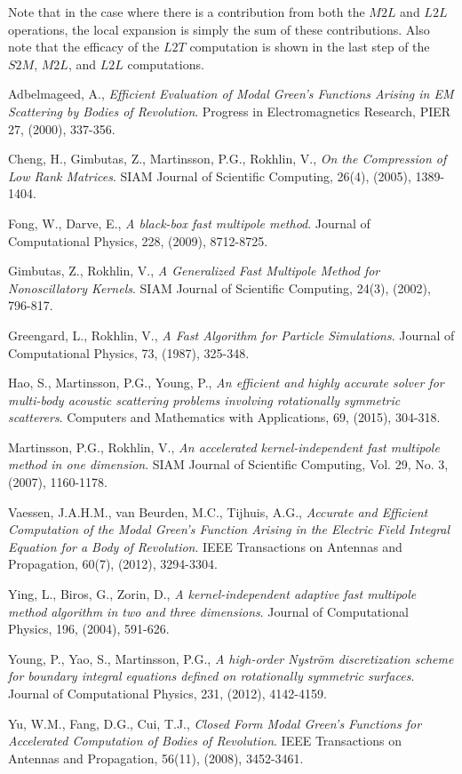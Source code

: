 \documentclass[11pt, oneside]{article}   	%
\begin{document}
\begin{appendices}
Note that in the case where there is a contribution from both the $M2L$ and $L2L$ operations, the local expansion is simply the sum of these contributions. Also note that the efficacy of the $L2T$ computation is shown in the last step of the $S2M$, $M2L$, and $L2L$ computations.
\end{appendices}

\begin{thebibliography}{99}

 Adbelmageed, A., \emph{Efficient Evaluation of Modal Green's Functions Arising in EM Scattering by Bodies of Revolution}. Progress in Electromagnetics Research, PIER 27, (2000), 337-356.

 Cheng, H., Gimbutas, Z., Martinsson, P.G., Rokhlin, V., \emph{On the Compression of Low Rank Matrices}. SIAM Journal of Scientific Computing, 26(4), (2005), 1389-1404.

 Fong, W., Darve, E., \emph{A black-box fast multipole method}. Journal of Computational Physics, 228, (2009), 8712-8725.

 Gimbutas, Z., Rokhlin, V., \emph{A Generalized Fast Multipole Method for Nonoscillatory Kernels}. SIAM Journal of Scientific Computing, 24(3), (2002), 796-817.

 Greengard, L., Rokhlin, V., \emph{A Fast Algorithm for Particle Simulations}. Journal of Computational Physics, 73, (1987), 325-348.

 Hao, S., Martinsson, P.G., Young, P., \emph{An efficient and highly accurate solver for multi-body acoustic scattering problems involving rotationally symmetric scatterers}. Computers and Mathematics with Applications, 69, (2015), 304-318.

 Martinsson, P.G., Rokhlin, V., \emph{An accelerated kernel-independent fast multipole method in one dimension}. SIAM Journal of Scientific Computing, Vol. 29, No. 3, (2007), 1160-1178.

 Vaessen, J.A.H.M., van Beurden, M.C., Tijhuis, A.G., \emph{Accurate and Efficient Computation of the Modal Green's Function Arising in the Electric Field Integral Equation for a Body of Revolution}. IEEE Transactions on Antennas and Propagation, 60(7), (2012), 3294-3304.

 Ying, L., Biros, G., Zorin, D., \emph{A kernel-independent adaptive fast multipole method algorithm in two and three dimensions}. Journal of Computational Physics, 196, (2004), 591-626.

 Young, P., Yao, S., Martinsson, P.G., \emph{A high-order Nystr{\"o}m discretization scheme for boundary integral equations defined on rotationally symmetric surfaces}. Journal of Computational Physics, 231, (2012), 4142-4159.

 Yu, W.M., Fang, D.G., Cui, T.J., \emph{Closed Form Modal Green's Functions for Accelerated Computation of Bodies of Revolution}. IEEE Transactions on Antennas and Propagation, 56(11), (2008), 3452-3461.

\end{thebibliography}
\end{document}
